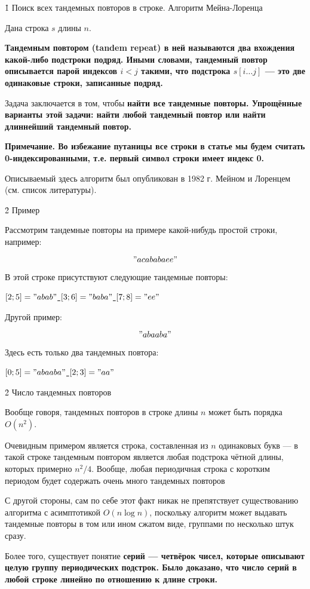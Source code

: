 \h1{ Поиск всех тандемных повторов в строке. Алгоритм Мейна-Лоренца }

Дана строка $s$ длины $n$.

\bf{Тандемным повтором} (tandem repeat) в ней называются два вхождения какой-либо подстроки подряд. Иными словами, тандемный повтор описывается парой индексов $i < j$ такими, что подстрока $s[i \ldots j]$ --- это две одинаковые строки, записанные подряд.

Задача заключается в том, чтобы \bf{найти все тандемные повторы}. Упрощённые варианты этой задачи: найти \bf{любой} тандемный повтор или найти \bf{длиннейший} тандемный повтор.

\bf{Примечание}. Во избежание путаницы все строки в статье мы будем считать 0-индексированными, т.е. первый символ строки имеет индекс 0.

Описываемый здесь алгоритм был опубликован в 1982 г. Мейном и Лоренцем (см. список литературы).


\h2{ Пример }

Рассмотрим тандемные повторы на примере какой-нибудь простой строки, например:

$$ "acababaee" $$

В этой строке присутствуют следующие тандемные повторы:

\ul{
\li $[2;5] = "abab"$
\li $[3;6] = "baba"$
\li $[7;8] = "ee"$
}

Другой пример:

$$ "abaaba" $$

Здесь есть только два тандемных повтора:

\ul{
\li $[0;5] = "abaaba"$
\li $[2;3] = "aa"$
}


\h2{ Число тандемных повторов }

Вообще говоря, тандемных повторов в строке длины $n$ может быть порядка $O(n^2)$.

Очевидным примером является строка, составленная из $n$ одинаковых букв --- в такой строке тандемным повтором является любая подстрока чётной длины, которых примерно $n^2 / 4$. Вообще, любая периодичная строка с коротким периодом будет содержать очень много тандемных повторов

С другой стороны, сам по себе этот факт никак не препятствует существованию алгоритма с асимптотикой $O (n \log n)$, поскольку алгоритм может выдавать тандемные повторы в том или ином сжатом виде, группами по несколько штук сразу.

Более того, существует понятие \bf{серий} --- четвёрок чисел, которые описывают целую группу периодических подстрок. Было доказано, что число серий в любой строке линейно по отношению к длине строки.

